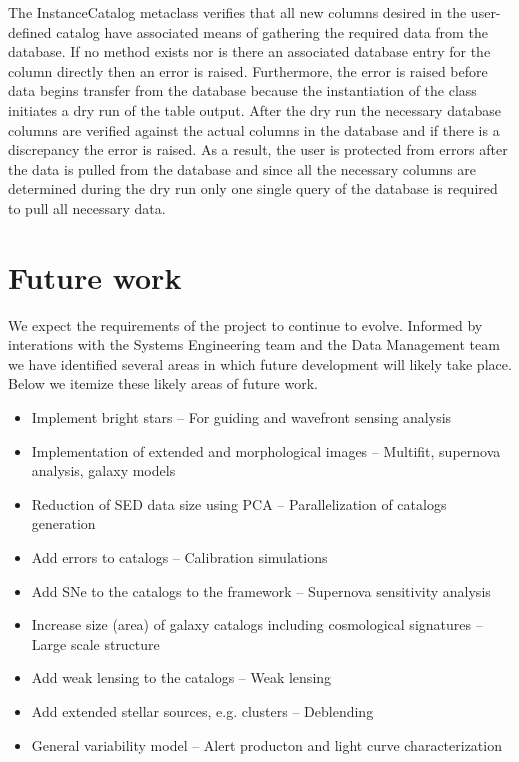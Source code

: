 \documentclass[]{article}
\begin{document}
The InstanceCatalog metaclass verifies that all new columns desired in the user-defined catalog have associated means of gathering the required data from the database. If no method exists nor is there an associated database entry for the column directly then an error is raised. Furthermore, the error is raised before data begins transfer from the database because the instantiation of the class initiates a dry run of the table output. After the dry run the necessary database columns are verified
against the actual columns in the database and if there is a discrepancy the error is raised. As a result, the user is protected from errors after the data is pulled from the database and since all the necessary columns are determined during the dry run only one single query of the database is required to pull all necessary data.
\section{Future work}
We expect the requirements of the project to continue to evolve.  Informed by interations with the Systems Engineering team and the Data Management team we have 
identified several areas in which future development will likely take place.  Below we itemize these likely areas of future work.
\begin{itemize}
\item Implement bright stars -- For guiding and wavefront sensing analysis
\item Implementation of extended and morphological images -- Multifit, supernova analysis, galaxy models
\item Reduction of SED data size using PCA -- Parallelization of catalogs generation
\item Add errors to catalogs -- Calibration simulations
\item Add SNe to the catalogs to the framework -- Supernova sensitivity analysis
\item Increase size (area) of galaxy catalogs including cosmological signatures -- Large scale structure
\item Add weak lensing to the catalogs -- Weak lensing
\item Add extended stellar sources, e.g. clusters -- Deblending
\item General variability model -- Alert producton and light curve characterization
\end{itemize}
\clearpage


\end{document}
